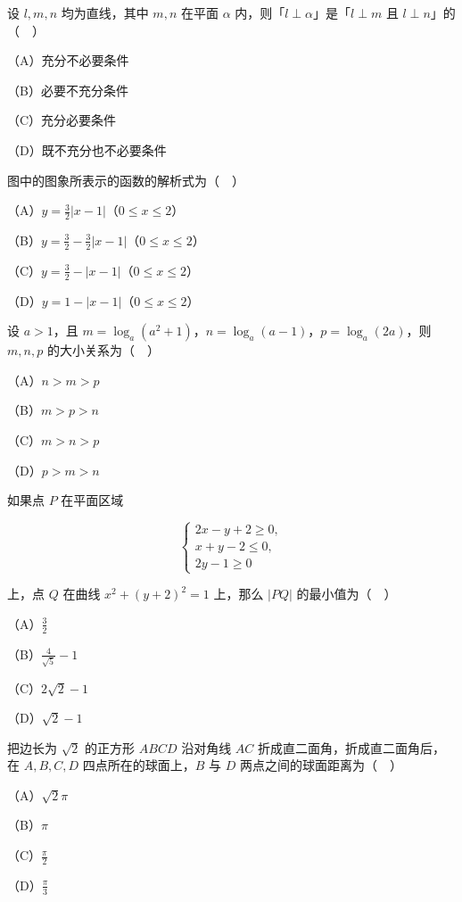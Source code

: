 \begin{question}
设 $l,m,n$ 均为直线，其中 $m,n$ 在平面 $\alpha$ 内，则「$l\perp\alpha$」是「$l\perp m$ 且 $l\perp n$」的（　）

（A）充分不必要条件

（B）必要不充分条件

（C）充分必要条件

（D）既不充分也不必要条件

\Needspace{0.4\textheight}
\end{question}
\begin{question}
图中的图象所表示的函数的解析式为（　）
\nopagebreak[4]
\begin{center}\end{center}
\nopagebreak[4]
（A）$y=\frac32|x-1|$（$0\leqslant x\leqslant2$）

（B）$y=\frac32-\frac32|x-1|$（$0\leqslant x\leqslant2$）

（C）$y=\frac32-|x-1|$（$0\leqslant x\leqslant2$）

（D）$y=1-|x-1|$（$0\leqslant x\leqslant2$）

\end{question}
\begin{question}
设 $a>1$，且 $m=\log_a(a^2+1)$，$n=\log_a(a-1)$，$p=\log_a(2a)$，则 $m,n,p$ 的大小关系为（　）

（A）$n>m>p$

（B）$m>p>n$

（C）$m>n>p$

（D）$p>m>n$

\end{question}
\begin{question}
如果点 $P$ 在平面区域

\nopagebreak[4]
\[\begin{cases}2x-y+2\geqslant 0,\\ x+y-2\leqslant 0,\\ 2y-1\geqslant 0\end{cases}\]

上，点 $Q$ 在曲线 $x^2+(y+2)^2=1$ 上，那么 $|PQ|$ 的最小值为（　）

（A）$\frac32$

（B）$\frac{4}{\sqrt5}-1$

（C）$2\sqrt2-1$

（D）$\sqrt2-1$

\end{question}
\begin{question}
把边长为 $\sqrt2$ 的正方形 $ABCD$ 沿对角线 $AC$ 折成直二面角，折成直二面角后，在 $A,B,C,D$ 四点所在的球面上，$B$ 与 $D$ 两点之间的球面距离为（　）

（A）$\sqrt2\pi$

（B）$\pi$

（C）$\frac{\pi}{2}$

（D）$\frac{\pi}{3}$

\end{question}

